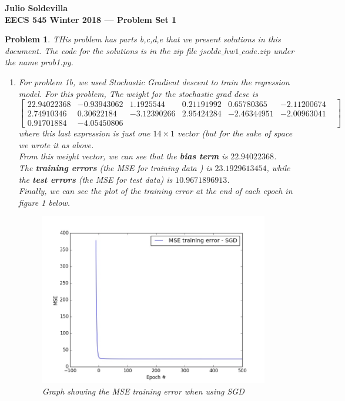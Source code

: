 \documentclass[12pt]{article}
\newtheorem{problem}{Problem}%
\begin{document}
\begin{center}
{\bf Julio Soldevilla}
\\
{\bf EECS 545 Winter 2018 --- Problem Set 1 }
\end{center}

\begin{problem}
\normalfont
THis problem has parts b,c,d,e that we present solutions in this document. The code for the solutions is in the zip file $jsolde\_hw1\_code.zip$ under the name prob1.py.

\begin{enumerate}
\item For problem 1b, we used Stochastic Gradient descent to train the regression model. For this problem, The weight for the stochastic grad desc is \[\left[\begin{matrix} 22.94022368 & -0.93943062 &  1.1925544  &  0.21191992 & 0.65780365
 & -2.11200674 &  \\ 2.74910346 &  0.30622184 & -3.12390266 & 2.95424284 & -2.46344951 & -2.00963041 \\ 0.91701884 & -4.05450806 \end{matrix}\right]\] where this last expression is just one $14 \times 1$ vector (but for the sake of space we wrote it as above.\\
 From this weight vector, we can see that the \textbf{bias term} is $22.94022368$.\\
 The \textbf{training errors} (the MSE for training data ) is $23.1929613454$, while the \textbf{test errors} (the MSE for test data) is $10.9671896913$.\\

 Finally, we can see the plot of the training error at the end of each epoch in figure 1 below.

\begin{figure}[h]
\centering
\includegraphics[width=10cm]{MSE_training_error_SGD.jpg}
\caption{Graph showing the MSE training error when using SGD}
\end{figure}


\end{enumerate}
\end{problem}
\end{document}
